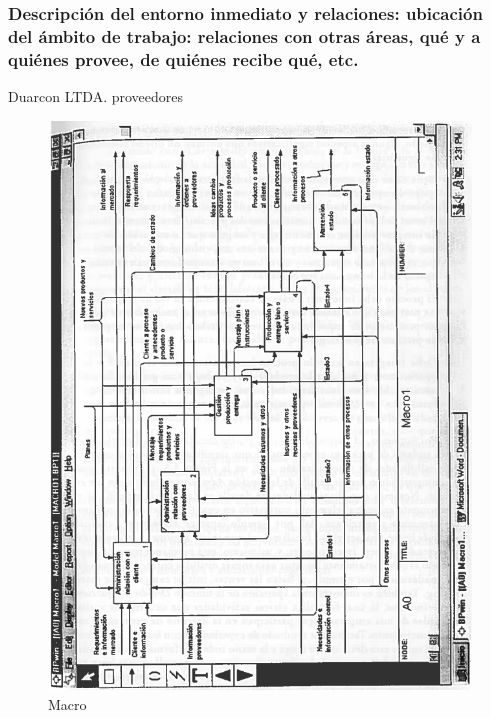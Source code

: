 \documentclass[
]{article}
\begin{document}
\hypertarget{descripciuxf3n-del-entorno-inmediato-y-relaciones-ubicaciuxf3n-del-uxe1mbito-de-trabajo-relaciones-con-otras-uxe1reas-quuxe9-y-a-quiuxe9nes-provee-de-quiuxe9nes-recibe-quuxe9-etc.}{%
\subsubsection{Descripción del entorno inmediato y relaciones: ubicación
del ámbito de trabajo: relaciones con otras áreas, qué y a quiénes
provee, de quiénes recibe qué,
etc.}\label{descripciuxf3n-del-entorno-inmediato-y-relaciones-ubicaciuxf3n-del-uxe1mbito-de-trabajo-relaciones-con-otras-uxe1reas-quuxe9-y-a-quiuxe9nes-provee-de-quiuxe9nes-recibe-quuxe9-etc.}}

Duarcon LTDA. proveedores

\begin{figure}
\centering
\includegraphics{fig/Macro.png}
\caption{Macro}
\end{figure}
\end{document}
